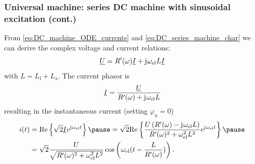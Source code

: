 \begin{frame}
	\frametitle{Universal machine: series DC machine with sinusoidal excitation (cont.)}
	From \eqref{eq:DC_machine_ODE_currents} and \eqref{eq:DC_series_machine_char} we can derive the complex voltage and current relations:
	\begin{equation}
		\underline{U} = R'(\omega)\underline{I} + \mathrm{j}\mkern1mu \omega_\mathrm{el} L \underline{I}
	\end{equation}
	with $L = L_\mathrm{f}+L_\mathrm{a}$. \pause The current phasor is
	\begin{equation}
		\underline{I} = \frac{\underline{U}}{R'(\omega) + \mathrm{j}\mkern1mu \omega_\mathrm{el} L}
	\end{equation} \pause
	resulting in the instantaneous current (setting $\varphi_{\mathrm{u}}=0$)
	\begin{align}
		i(t) & = \mathrm{Re}\left\{ \sqrt{2}\underline{I} e^{\iu\omega_\mathrm{el}t}\right\}\pause =\sqrt{2}\mathrm{Re}\left\{ \frac{U\left(R'(\omega)-\iu\omega_\mathrm{el}L\right)}{R'(\omega)^2+\omega_\mathrm{el}^2L^2} e^{\iu\omega_\mathrm{el}t}\right\} \pause \\
		     & =\sqrt{2}\frac{U}{\sqrt{R'(\omega)^2+\omega_\mathrm{el}^2L^2}}\cos\left(\omega_\mathrm{el}(t-\frac{L}{R'(\omega)})\right).
	\end{align}
\end{frame}

